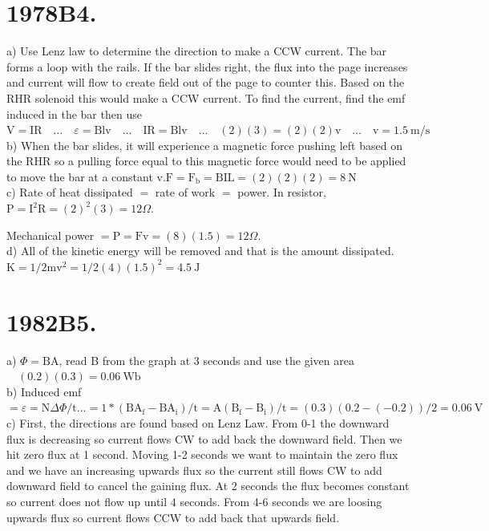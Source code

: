 \begin{enumerate}
\section*{1978B4.}
a) Use Lenz law to determine the direction to make a CCW current. The bar forms a loop with the rails. If the bar slides right, the flux into the page increases and current will flow to create field out of the page to counter this. Based on the RHR solenoid this would make a CCW current. To find the current, find the emf induced in the bar then use $\mathrm{V}=\mathrm{IR} \quad \ldots \quad \varepsilon=\mathrm{Blv} \quad \ldots \quad \mathrm{IR}=\mathrm{Blv} \quad \ldots \quad(2)(3)=(2)(2) \mathrm{v} \quad \ldots \quad \mathrm{v}=1.5 \mathrm{~m} / \mathrm{s}$\\
b) When the bar slides, it will experience a magnetic force pushing left based on the RHR so a pulling force equal to this magnetic force would need to be applied to move the bar at a constant $\mathrm{v} . \mathrm{F}=\mathrm{F}_{\mathrm{b}}=\mathrm{BIL}=(2)(2)(2)=8 \mathrm{~N}$\\
c) Rate of heat dissipated $=$ rate of work $=$ power. In resistor, $\mathrm{P}=\mathrm{I}^{2} \mathrm{R}=(2)^{2}(3)=12 \Omega$.

Mechanical power $=\mathrm{P}=\mathrm{Fv}=(8)(1.5)=12 \Omega$.\\
d) All of the kinetic energy will be removed and that is the amount dissipated. $\mathrm{K}=1 / 2 \mathrm{mv}^{2}=1 / 2(4)(1.5)^{2}=4.5 \mathrm{~J}$

\section*{1982B5.}
a) $\Phi=\mathrm{BA}$, read B from the graph at 3 seconds and use the given area $\quad(0.2)(0.3)=0.06 \mathrm{~Wb}$\\
b) Induced emf $=\varepsilon=\mathrm{N} \Delta \Phi / \mathrm{t} \ldots=1 *\left(\mathrm{BA}_{\mathrm{f}}-\mathrm{BA}_{\mathrm{i}}\right) / \mathrm{t}=\mathrm{A}\left(\mathrm{B}_{\mathrm{f}}-\mathrm{B}_{\mathrm{i}}\right) / \mathrm{t}=(0.3)(0.2-(-0.2)) / 2=0.06 \mathrm{~V}$\\
c) First, the directions are found based on Lenz Law. From 0-1 the downward flux is decreasing so current flows CW to add back the downward field. Then we hit zero flux at 1 second. Moving 1-2 seconds we want to maintain the zero flux and we have an increasing upwards flux so the current still flows CW to add downward field to cancel the gaining flux. At 2 seconds the flux becomes constant so current does not flow up until 4 seconds. From 4-6 seconds we are loosing upwards flux so current flows CCW to add back that upwards field.


\end{enumerate}
